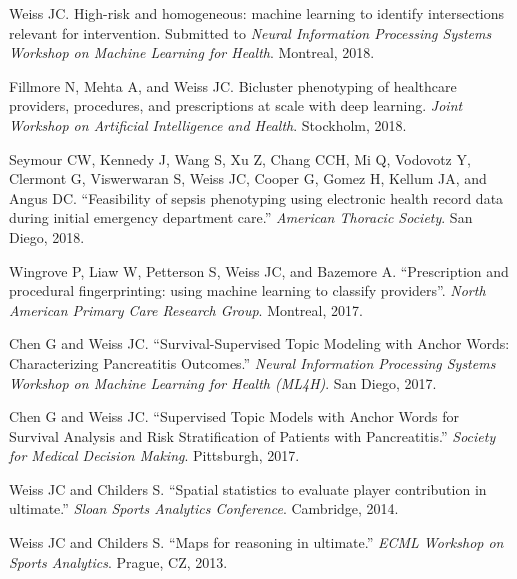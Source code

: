 \begin{bibsection}

\item  Weiss JC.  High-risk and homogeneous: machine learning to identify intersections relevant for intervention.  Submitted to \textit{Neural Information Processing Systems Workshop on Machine Learning for Health}.  Montreal, 2018.
  
\item  Fillmore N, Mehta A, and Weiss JC. Bicluster phenotyping of healthcare providers, procedures, and prescriptions at scale with deep learning. \textit{Joint Workshop on Artificial Intelligence and Health}. Stockholm, 2018.
  
\item  Seymour CW, Kennedy J, Wang S, Xu Z, Chang CCH, Mi Q, Vodovotz Y, Clermont G, Viswerwaran S, Weiss JC, Cooper G, Gomez H, Kellum JA, and Angus DC. ``Feasibility of sepsis phenotyping using electronic health record data during initial emergency department care.'' \textit{American Thoracic Society}. San Diego, 2018.

\item Wingrove P, Liaw W, Petterson S, Weiss JC, and Bazemore A. ``Prescription and procedural fingerprinting: using machine learning to classify providers''. \emph{North American Primary Care Research Group}. Montreal, 2017.
  
\item  Chen G and Weiss JC. ``Survival-Supervised Topic Modeling with Anchor Words: Characterizing Pancreatitis Outcomes.'' \textit{Neural Information Processing Systems Workshop on Machine Learning for Health (ML4H)}. San Diego, 2017.
  
\item  Chen G and Weiss JC. ``Supervised Topic Models with Anchor Words for Survival Analysis and Risk Stratification of Patients with Pancreatitis.'' \textit{Society for Medical Decision Making}. Pittsburgh, 2017.
  
\item  Weiss JC and Childers S. ``Spatial statistics to evaluate player contribution in ultimate.'' \textit{Sloan Sports Analytics Conference}. Cambridge, 2014.

\item  Weiss JC and Childers S. ``Maps for reasoning in ultimate.'' \textit{ECML Workshop on Sports Analytics}. Prague, CZ, 2013.


\end{bibsection}
